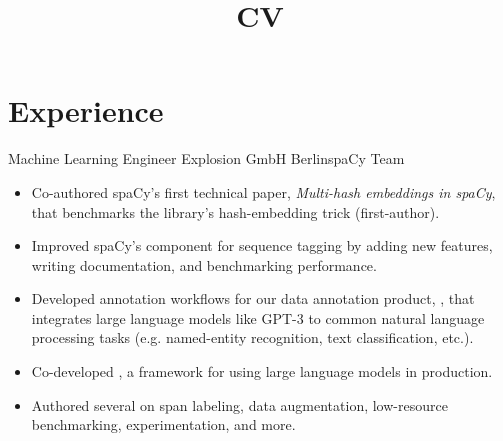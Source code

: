 \documentclass[12pt,a4paper]{moderncv}
\title{CV}
\begin{document}
\maketitle


\section{Experience}

{Machine Learning Engineer}
{Explosion GmbH}
{Berlin}{spaCy Team}
{
    \begin{itemize}
        \item Co-authored spaCy's first technical paper, \textit{Multi-hash
        embeddings in spaCy}, that benchmarks the library's hash-embedding trick
        (first-author).
        \item Improved spaCy's {\color{blue}} component for sequence tagging by
        adding new features, writing documentation, and benchmarking
        performance.
        \item Developed annotation workflows for our data annotation product,
        {\color{blue}}, that integrates
        large language models like GPT-3 to common natural language processing
        tasks (e.g. named-entity recognition, text classification, etc.).  
        \item Co-developed
        {\color{blue}}, a
        framework for using large language models in production.
        \item Authored several {\color{blue}} on span labeling,
        data augmentation, low-resource benchmarking, experimentation, and more.
    \end{itemize}
}
\vspace{0.5em}
\end{document}
